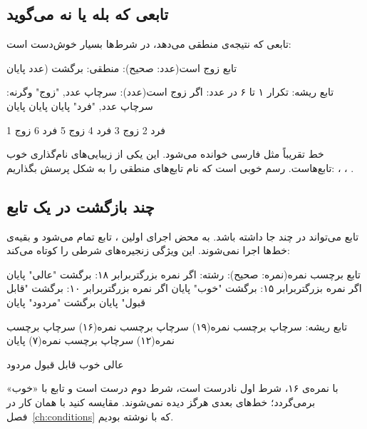 \subsection{تابعی که بله یا نه می‌گوید}

تابعی که نتیجه‌ی منطقی می‌دهد، در شرط‌ها بسیار خوش‌دست است:

\begin{salamfa}
تابع زوج است(عدد: صحیح): منطقی:
    برگشت (عدد %
پایان

تابع ریشه:
    تکرار ۱ تا ۶ در عدد:
        اگر زوج است(عدد):
            سرچاپ عدد, "زوج"
        وگرنه:
            سرچاپ عدد, "فرد"
        پایان
    پایان
پایان
\end{salamfa}

\begin{outputfa}
1 فرد
2 زوج
3 فرد
4 زوج
5 فرد
6 زوج
\end{outputfa}

خط  تقریباً مثل فارسی خوانده می‌شود. این یکی از
زیبایی‌های نام‌گذاری خوب تابع‌هاست. رسم خوبی است که نام تابع‌های منطقی را
به شکل پرسش بگذاریم: ، ، .

\subsection{چند بازگشت در یک تابع}

تابع می‌تواند در چند جا  داشته باشد. به محض اجرای اولین
، تابع تمام می‌شود و بقیه‌ی خط‌ها اجرا نمی‌شوند. این ویژگی
زنجیره‌های شرطی را کوتاه می‌کند:

\begin{salamfa}
تابع برچسب نمره(نمره: صحیح): رشته:
    اگر نمره بزرگتربرابر ۱۸: برگشت "عالی" پایان
    اگر نمره بزرگتربرابر ۱۵: برگشت "خوب" پایان
    اگر نمره بزرگتربرابر ۱۰: برگشت "قابل قبول" پایان
    برگشت "مردود"
پایان

تابع ریشه:
    سرچاپ برچسب نمره(۱۹)
    سرچاپ برچسب نمره(۱۶)
    سرچاپ برچسب نمره(۱۲)
    سرچاپ برچسب نمره(۷)
پایان
\end{salamfa}

\begin{outputfa}
عالی
خوب
قابل قبول
مردود
\end{outputfa}

با نمره‌ی ۱۶، شرط اول نادرست است، شرط دوم درست است و تابع با «خوب»
برمی‌گردد؛ خط‌های بعدی هرگز دیده نمی‌شوند. مقایسه کنید با همان کار در فصل~\ref{ch:conditions} که با  نوشته بودیم.

